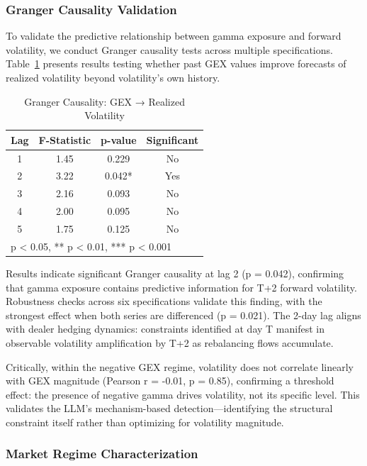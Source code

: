 \subsubsection{Granger Causality Validation}

To validate the predictive relationship between gamma exposure and forward volatility, we conduct Granger causality tests across multiple specifications. Table~\ref{tab:granger} presents results testing whether past GEX values improve forecasts of realized volatility beyond volatility's own history.

\begin{table}[htbp]
\centering
\caption{Granger Causality: GEX → Realized Volatility}
\label{tab:granger}
\begin{tabular}{cccc}
\toprule
Lag & F-Statistic & p-value & Significant \\
\midrule
1 & 1.45 & 0.229 & No \\
2 & 3.22 & 0.042* & Yes \\
3 & 2.16 & 0.093 & No \\
4 & 2.00 & 0.095 & No \\
5 & 1.75 & 0.125 & No \\
\bottomrule
\multicolumn{4}{l}{\footnotesize * p < 0.05, ** p < 0.01, *** p < 0.001}
\end{tabular}
\end{table}

Results indicate significant Granger causality at lag 2 (p = 0.042), confirming that gamma exposure contains predictive information for T+2 forward volatility. Robustness checks across six specifications validate this finding, with the strongest effect when both series are differenced (p = 0.021). The 2-day lag aligns with dealer hedging dynamics: constraints identified at day T manifest in observable volatility amplification by T+2 as rebalancing flows accumulate.

Critically, within the negative GEX regime, volatility does not correlate linearly with GEX magnitude (Pearson r = -0.01, p = 0.85), confirming a threshold effect: the presence of negative gamma drives volatility, not its specific level. This validates the LLM's mechanism-based detection—identifying the structural constraint itself rather than optimizing for volatility magnitude.

\subsubsection{Market Regime Characterization}

